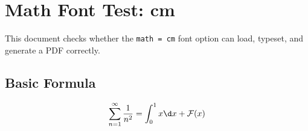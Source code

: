 \documentclass[lang = en, math = cm, font = none, mode = simple]{elegantbook-l3}
\begin{document}
\frontmatter
\tableofcontents

\mainmatter
\chapter{Math Font Test: cm}

This document checks whether the \texttt{math = cm} font option can load,
typeset, and generate a PDF correctly.

\section{Basic Formula}

\[
  \sum_{n=1}^{\infty} \frac{1}{n^2}
  =
  \int_0^1 x\d x + \mathcal{F}(x)
\]
\end{document}
